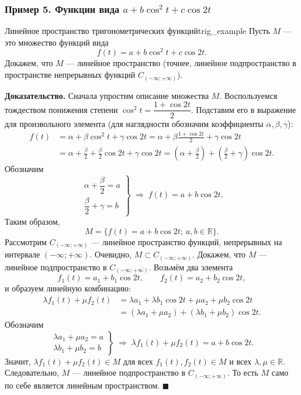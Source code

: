 \documentclass[12pt,a4paper]{article}
\newenvironment{myproof}{\noindent\textbf{Доказательство.}}{\hfill$\blacksquare$}
\begin{document}
\subsubsection*{Пример 5. Функции вида $a + b\cos^2 t + c\cos 2t$}

\begin{definition}{Линейное пространство тригонометрических
функций}{trig_example}
Пусть $M$ — это множество функций вида
\[
f(t) = a + b\cos^2 t + c\cos 2t.
\]
Докажем, что $M$ — линейное пространство (точнее, линейное
подпространство в пространстве непрерывных функций $C_{(-\infty;+\infty)}$).
\end{definition}

\begin{myproof}
Сначала упростим описание множества $M$. Воспользуемся тождеством
понижения степени
$\cos^2 t = \dfrac{1 + \cos 2t}{2}$. Подставим его в выражение для
произвольного элемента (для наглядности обозначим коэффициенты
$\alpha, \beta, \gamma$):
\begin{align*}
f(t) &= \alpha + \beta \cos^2 t + \gamma \cos 2t
= \alpha + \beta \frac{1 + \cos 2t}{2} + \gamma \cos 2t \\
&= \alpha + \frac{\beta}{2} + \frac{\beta}{2}\cos 2t + \gamma \cos 2t
= \left(\alpha + \frac{\beta}{2}\right)
+ \left(\frac{\beta}{2} + \gamma\right)\cos 2t.
\end{align*}
Обозначим
\[
\left.
\begin{array}{l}
\alpha + \dfrac{\beta}{2} = a \\[4pt]
\dfrac{\beta}{2} + \gamma = b
\end{array}
\right\}
\;\Rightarrow\;
f(t) = a + b\cos 2t.
\]
Таким образом,
\[
M = \{ f(t) = a + b\cos 2t;\ a, b \in \mathbb{R} \}.
\]
Рассмотрим $C_{(-\infty;+\infty)}$ — линейное пространство функций,
непрерывных на интервале $(-\infty; +\infty)$. Очевидно,
$M \subset C_{(-\infty;+\infty)}$. Докажем, что $M$ — линейное
подпространство в $C_{(-\infty;+\infty)}$. Возьмём два элемента
\[
f_1(t) = a_1 + b_1 \cos 2t, \qquad
f_2(t) = a_2 + b_2 \cos 2t,
\]
и образуем линейную комбинацию:
\begin{align*}
\lambda f_1(t) + \mu f_2(t)
&= \lambda a_1 + \lambda b_1 \cos 2t + \mu a_2 + \mu b_2 \cos 2t \\
&= (\lambda a_1 + \mu a_2) + (\lambda b_1 + \mu b_2)\cos 2t.
\end{align*}
Обозначим
\[
\left.
\begin{array}{l}
\lambda a_1 + \mu a_2 = a \\
\lambda b_1 + \mu b_2 = b
\end{array}
\right\}
\;\Rightarrow\;
\lambda f_1(t) + \mu f_2(t) = a + b\cos 2t.
\]
Значит, $\lambda f_1(t) + \mu f_2(t) \in M$ для всех
$f_1(t), f_2(t) \in M$ и всех $\lambda, \mu \in \mathbb{R}$.
Следовательно, $M$ — линейное подпространство в
$C_{(-\infty;+\infty)}$. То есть $M$ само по себе является линейным
пространством.
\end{myproof}
\end{document}
